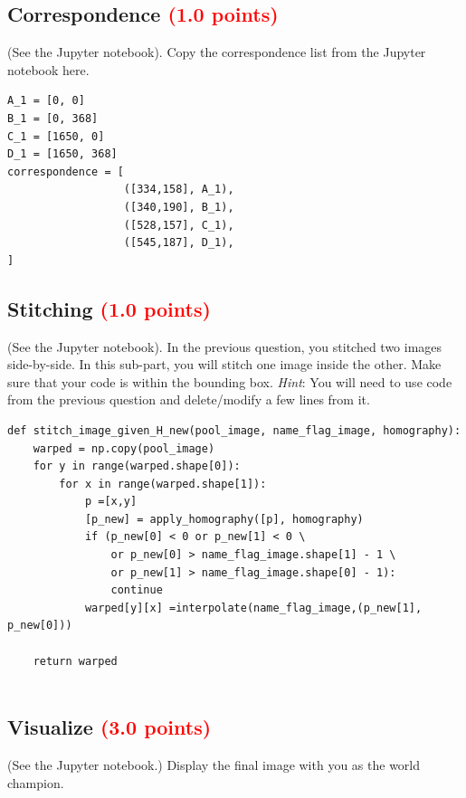 \documentclass[answers]{exam}
\newcommand{\mypoints}[1]{\textcolor{red}{(#1 points)}}
\begin{document}
\subsection{Correspondence \mypoints{1.0}}
(See the Jupyter notebook).
Copy the correspondence list from the Jupyter notebook here.
\begin{solution}
\begin{verbatim}
A_1 = [0, 0]
B_1 = [0, 368]
C_1 = [1650, 0] 
D_1 = [1650, 368]
correspondence = [
                  ([334,158], A_1),
                  ([340,190], B_1),
                  ([528,157], C_1),
                  ([545,187], D_1),
]

\end{verbatim}
\end{solution}

\subsection{Stitching \mypoints{1.0}}
(See the Jupyter notebook).
In the previous question, you stitched two images side-by-side. In this sub-part, you will stitch one image inside the other. Make sure that your code is within the bounding box.
\textit{Hint}: You will need to use code from the previous question and delete/modify a few lines from it.
\begin{solution}
\begin{verbatim}
def stitch_image_given_H_new(pool_image, name_flag_image, homography):
    warped = np.copy(pool_image)
    for y in range(warped.shape[0]):
        for x in range(warped.shape[1]):
            p =[x,y]
            [p_new] = apply_homography([p], homography)
            if (p_new[0] < 0 or p_new[1] < 0 \
                or p_new[0] > name_flag_image.shape[1] - 1 \
                or p_new[1] > name_flag_image.shape[0] - 1):
                continue
            warped[y][x] =interpolate(name_flag_image,(p_new[1], p_new[0]))

    return warped
    
\end{verbatim}

\end{solution}

\subsection{Visualize \mypoints{3.0}}
(See the Jupyter notebook.)
Display the final image with you as the world champion.
\end{document}
